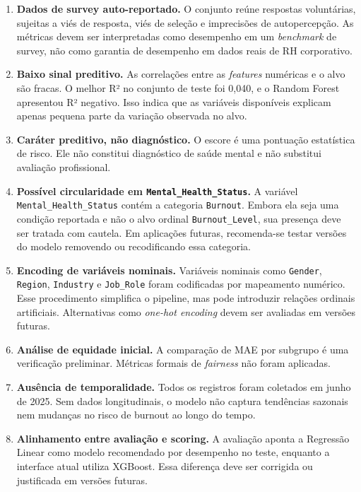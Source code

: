 \documentclass[conference]{IEEEtran}
\begin{document}
\begin{enumerate}
\item \textbf{Dados de survey auto-reportado.} O conjunto reúne respostas
voluntárias, sujeitas a viés de resposta, viés de seleção e
imprecisões de autopercepção. As métricas devem ser interpretadas
como desempenho em um \textit{benchmark} de survey, não como
garantia de desempenho em dados reais de RH corporativo.

\item \textbf{Baixo sinal preditivo.} As correlações entre as
      \textit{features} numéricas e o alvo são fracas. O melhor R² no
      conjunto de teste foi 0,040, e o Random Forest apresentou R²
      negativo. Isso indica que as variáveis disponíveis explicam apenas
      pequena parte da variação observada no alvo.

\item \textbf{Caráter preditivo, não diagnóstico.} O escore é uma
      pontuação estatística de risco. Ele não constitui diagnóstico de
      saúde mental e não substitui avaliação profissional.

\item \textbf{Possível circularidade em \texttt{Mental\_Health\_Status}.}
      A variável \texttt{Mental\_Health\_Status} contém a categoria
      \texttt{Burnout}. Embora ela seja uma condição reportada e não o
      alvo ordinal \texttt{Burnout\_Level}, sua presença deve ser tratada
      com cautela. Em aplicações futuras, recomenda-se testar versões do
      modelo removendo ou recodificando essa categoria.

\item \textbf{Encoding de variáveis nominais.} Variáveis nominais como
      \texttt{Gender}, \texttt{Region}, \texttt{Industry} e
      \texttt{Job\_Role} foram codificadas por mapeamento numérico. Esse
      procedimento simplifica o pipeline, mas pode introduzir relações
      ordinais artificiais. Alternativas como \textit{one-hot encoding}
      devem ser avaliadas em versões futuras.

\item \textbf{Análise de equidade inicial.} A comparação de MAE por
      subgrupo é uma verificação preliminar. Métricas formais de
      \textit{fairness} não foram aplicadas.

\item \textbf{Ausência de temporalidade.} Todos os registros foram
      coletados em junho de 2025. Sem dados longitudinais, o modelo não
      captura tendências sazonais nem mudanças no risco de burnout ao
      longo do tempo.

\item \textbf{Alinhamento entre avaliação e scoring.} A avaliação aponta
      a Regressão Linear como modelo recomendado por desempenho no teste,
      enquanto a interface atual utiliza XGBoost. Essa diferença deve ser
      corrigida ou justificada em versões futuras.

\end{enumerate}
\end{document}
